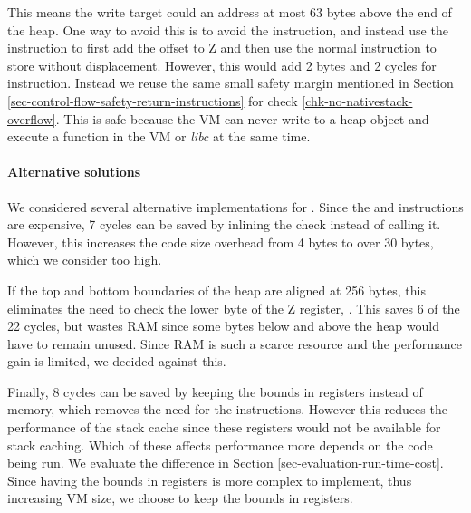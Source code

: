 This means the write target could an address at most 63 bytes above the end of the heap. One way to avoid this is to avoid the  instruction, and instead use the  instruction to first add the offset to Z and then use the normal  instruction to store without displacement. However, this would add 2 bytes and 2 cycles for instruction. Instead we reuse the same small safety margin mentioned in Section \ref{sec-control-flow-safety-return-instructions} for check \ref{chk-no-nativestack-overflow}. This is safe because the VM can never write to a heap object and execute a function in the VM or \emph{libc} at the same time.

\paragraph{Alternative solutions}
We considered several alternative implementations for . Since the  and  instructions are expensive, 7 cycles can be saved by inlining the check instead of calling it. However, this increases the code size overhead from 4 bytes to over 30 bytes, which we consider too high.

If the top and bottom boundaries of the heap are aligned at 256 bytes, this eliminates the need to check the lower byte of the Z register, . This saves 6 of the 22 cycles, but wastes RAM since some bytes below and above the heap would have to remain unused. Since RAM is such a scarce resource and the performance gain is limited, we decided against this.

Finally, 8 cycles can be saved by keeping the bounds in registers instead of memory, which removes the need for the  instructions. However this reduces the performance of the stack cache since these registers would not be available for stack caching. Which of these affects performance more depends on the code being run. We evaluate the difference in Section \ref{sec-evaluation-run-time-cost}. Since having the bounds in registers is more complex to implement, thus increasing VM size, we choose to keep the bounds in registers.



